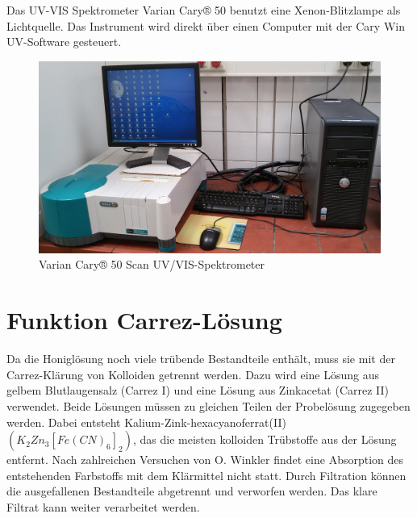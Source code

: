 Das UV-VIS Spektrometer Varian Cary® 50 benutzt eine Xenon-Blitzlampe als Lichtquelle. Das Instrument wird direkt über einen Computer mit der Cary Win UV-Software gesteuert. 
\begin{figure}[htbp]
	\centering
		\includegraphics[width=1.00\textwidth]{../Bilder/20150504_140611.jpg}
	\caption{Varian Cary® 50 Scan UV/VIS-Spektrometer}
	\label{fig:Spektrometer}
\end{figure}

\section{Funktion Carrez-Lösung}
Da die Honiglösung noch viele trübende Bestandteile enthält, muss sie mit der Carrez-Klärung von Kolloiden getrennt werden. Dazu wird eine Lösung aus gelbem Blutlaugensalz (Carrez I) und eine Lösung aus Zinkacetat (Carrez II) verwendet. Beide Lösungen müssen zu gleichen Teilen der Probelösung zugegeben werden. Dabei entsteht Kalium-Zink-hexacyanoferrat(II) $(K_{2}Zn_{3}[Fe(CN)_{6}]_{2})$, das die meisten kolloiden Trübstoffe aus der Lösung entfernt. Nach zahlreichen Versuchen von O. Winkler findet eine Absorption des entstehenden Farbstoffs mit dem Klärmittel nicht statt. Durch Filtration können die ausgefallenen Bestandteile abgetrennt und verworfen werden. Das klare Filtrat kann weiter verarbeitet werden.~\cite{Winkler}

